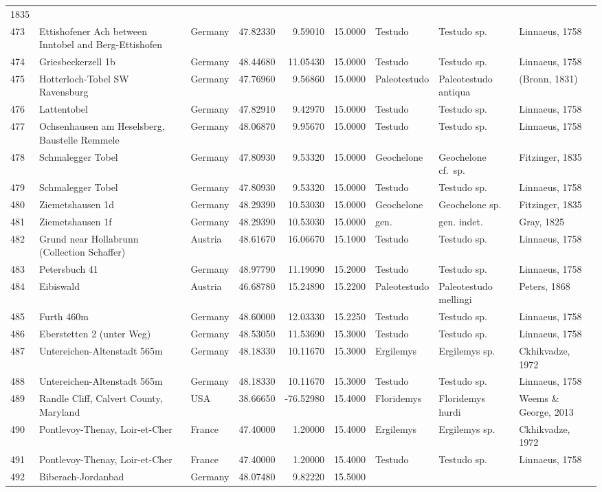 \documentclass[]{article}
\begin{document}
\begin{longtable}[]{@{}lllrrrlll@{}}
1835\tabularnewline
473 & Ettishofener Ach between Inntobel and Berg-Ettishofen & Germany &
47.82330 & 9.59010 & 15.0000 & Testudo & Testudo sp. & Linnaeus,
1758\tabularnewline
474 & Griesbeckerzell 1b & Germany & 48.44680 & 11.05430 & 15.0000 &
Testudo & Testudo sp. & Linnaeus, 1758\tabularnewline
475 & Hotterloch-Tobel SW Ravensburg & Germany & 47.76960 & 9.56860 &
15.0000 & Paleotestudo & Paleotestudo antiqua & (Bronn,
1831)\tabularnewline
476 & Lattentobel & Germany & 47.82910 & 9.42970 & 15.0000 & Testudo &
Testudo sp. & Linnaeus, 1758\tabularnewline
477 & Ochsenhausen am Heselsberg, Baustelle Remmele & Germany & 48.06870
& 9.95670 & 15.0000 & Testudo & Testudo sp. & Linnaeus,
1758\tabularnewline
478 & Schmalegger Tobel & Germany & 47.80930 & 9.53320 & 15.0000 &
Geochelone & Geochelone cf.~sp. & Fitzinger, 1835\tabularnewline
479 & Schmalegger Tobel & Germany & 47.80930 & 9.53320 & 15.0000 &
Testudo & Testudo sp. & Linnaeus, 1758\tabularnewline
480 & Ziemetshausen 1d & Germany & 48.29390 & 10.53030 & 15.0000 &
Geochelone & Geochelone sp. & Fitzinger, 1835\tabularnewline
481 & Ziemetshausen 1f & Germany & 48.29390 & 10.53030 & 15.0000 & gen.
& gen. indet. & Gray, 1825\tabularnewline
482 & Grund near Hollabrunn (Collection Schaffer) & Austria & 48.61670 &
16.06670 & 15.1000 & Testudo & Testudo sp. & Linnaeus,
1758\tabularnewline
483 & Petersbuch 41 & Germany & 48.97790 & 11.19090 & 15.2000 & Testudo
& Testudo sp. & Linnaeus, 1758\tabularnewline
484 & Eibiswald & Austria & 46.68780 & 15.24890 & 15.2200 & Paleotestudo
& Paleotestudo mellingi & Peters, 1868\tabularnewline
485 & Furth 460m & Germany & 48.60000 & 12.03330 & 15.2250 & Testudo &
Testudo sp. & Linnaeus, 1758\tabularnewline
486 & Eberstetten 2 (unter Weg) & Germany & 48.53050 & 11.53690 &
15.3000 & Testudo & Testudo sp. & Linnaeus, 1758\tabularnewline
487 & Untereichen-Altenstadt 565m & Germany & 48.18330 & 10.11670 &
15.3000 & Ergilemys & Ergilemys sp. & Ckhikvadze, 1972\tabularnewline
488 & Untereichen-Altenstadt 565m & Germany & 48.18330 & 10.11670 &
15.3000 & Testudo & Testudo sp. & Linnaeus, 1758\tabularnewline
489 & Randle Cliff, Calvert County, Maryland & USA & 38.66650 &
-76.52980 & 15.4000 & Floridemys & Floridemys hurdi & Weems \& George,
2013\tabularnewline
490 & Pontlevoy-Thenay, Loir-et-Cher & France & 47.40000 & 1.20000 &
15.4000 & Ergilemys & Ergilemys sp. & Ckhikvadze, 1972\tabularnewline
491 & Pontlevoy-Thenay, Loir-et-Cher & France & 47.40000 & 1.20000 &
15.4000 & Testudo & Testudo sp. & Linnaeus, 1758\tabularnewline
492 & Biberach-Jordanbad & Germany & 48.07480 & 9.82220 & 15.5000 &

\end{longtable}
\end{document}
